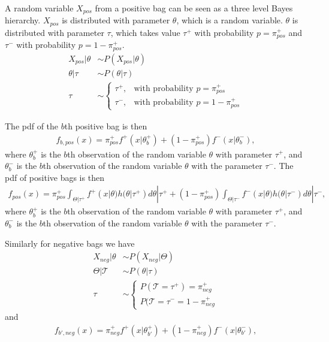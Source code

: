 A random variable $X_{pos}$ from a positive bag can be seen as a three level Bayes hierarchy. $X_{pos}$ is distributed with parameter $\theta$, which is a random variable. $\theta$ is distributed with parameter $\tau$, which takes value $\tau^+$ with probability $p = \pi_{pos}^+$ and $\tau^-$ with probability $p = 1-\pi_{pos}^+$.
\begin{align}
  X_{pos}|\theta & \sim P(X_{pos} | \theta) \\
  \theta|\tau &  \sim P(\theta|\tau) \\
  \tau & \sim \begin{cases}
    \tau^+, & \text{with probability } p = \pi_{pos}^+\\
    \tau^-, & \text{with probability } p = 1-\pi_{pos}^+
  \end{cases}
\end{align}

The pdf of the $b$th positive bag is then
\begin{align}
  f_{b,pos}(x) = \pi_{pos}^+ f^+(x|\theta^+_b) +(1-\pi_{pos}^+) f^-(x|\theta^-_b), 
\end{align}
where $\theta^+_b$ is the $b$th observation of the random variable $\theta$ with parameter $\tau^+$, and $\theta_b^-$ is the $b$th observation of the random variable $\theta$ with the parameter $\tau^-$.
The pdf of positive bags is then
\begin{align*}
  f_{pos}(x) = \pi_{pos}^+ \int_{\Theta|\tau^+} f^+(x|\theta)h(\theta|\tau^+) d\theta|\tau^+  +(1-\pi_{pos}^+) \int_{\Theta|\tau^-} f^-(x|\theta) h(\theta|\tau^-) d\theta|\tau^-, 
\end{align*}
where $\theta^+_b$ is the $b$th observation of the random variable $\theta$ with parameter $\tau^+$, and $\theta_b^-$ is the $b$th observation of the random variable $\theta$ with the parameter $\tau^-$.

Similarly for negative bags we have
\begin{align}
  X_{neg}|\theta & \sim P(X_{neg} | \Theta) \\
  \Theta|\mathcal{T} &  \sim P(\theta|\tau) \\
  \tau & \sim \begin{cases}
    P(\mathcal{T} = \tau^+) = \pi_{neg}^+\\
    P(\mathcal{T} = \tau^-  = 1-\pi_{neg}^+
  \end{cases}
\end{align}
and
\begin{align}
  f_{{b'},neg}(x) = \pi_{neg}^+ f^+(x|\theta^+_{b'}) +(1-\pi_{neg}^+) f^-(x|\theta^-_{b'}), 
\end{align}